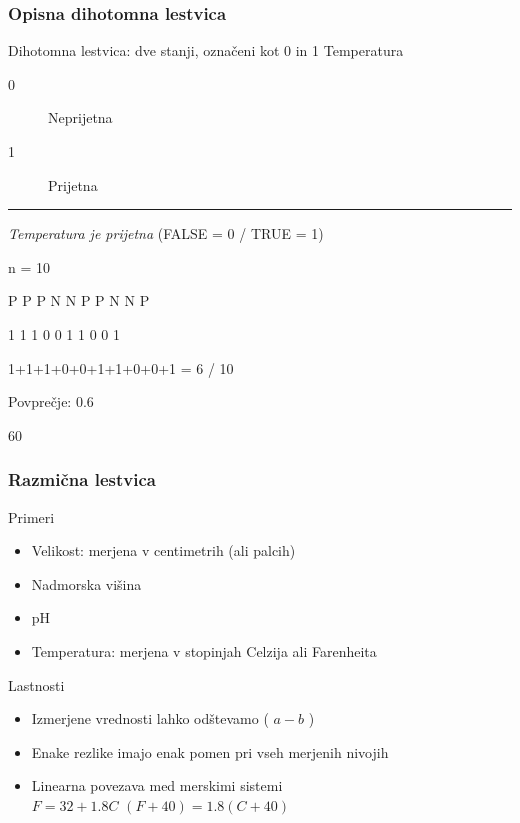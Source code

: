\begin{frame}[fragile]
\frametitle{Opisna dihotomna lestvica}
\begin{block}{Dihotomna lestvica: \hfill dve stanji, označeni kot 0 in 1}
Temperatura
\begin{description}
  \item[0] Neprijetna
  \item[1] Prijetna
\end{description}
\vspace{6pt}
\hrule
\vspace{6pt}
\emph{Temperatura je prijetna} (FALSE = 0 / TRUE = 1)

\end{block}
\begin{Schunk}
\begin{Soutput}
n = 10
\end{Soutput}
\begin{Soutput}
P P P N N P P N N P
\end{Soutput}
\begin{Soutput}
1 1 1 0 0 1 1 0 0 1
\end{Soutput}
\begin{Soutput}
1+1+1+0+0+1+1+0+0+1 = 6 / 10
\end{Soutput}
\begin{Soutput}
Povprečje: 0.6
\end{Soutput}
\begin{Soutput}
60% enot ima lastnost iz trditve (prijetno)
\end{Soutput}
\end{Schunk}

\end{frame}

\begin{frame}[fragile]
\frametitle{Razmična lestvica}
\begin{block}{Primeri}

\begin{itemize}
  \item Velikost: merjena v centimetrih (ali palcih)
  \item Nadmorska višina
  \item pH
  \item Temperatura: merjena v stopinjah Celzija ali Farenheita
\end{itemize}
\end{block}
\begin{block}{Lastnosti}

\begin{itemize}
  \item Izmerjene vrednosti lahko odštevamo ( $a - b$ ) 
  \item Enake rezlike imajo enak pomen pri vseh merjenih nivojih
  \item Linearna povezava med merskimi sistemi \\
   $F = 32 + 1.8 C$ \hfill $(F+40)=1.8 (C+40)$
  
  \end{itemize}
\end{block}
\end{frame}

